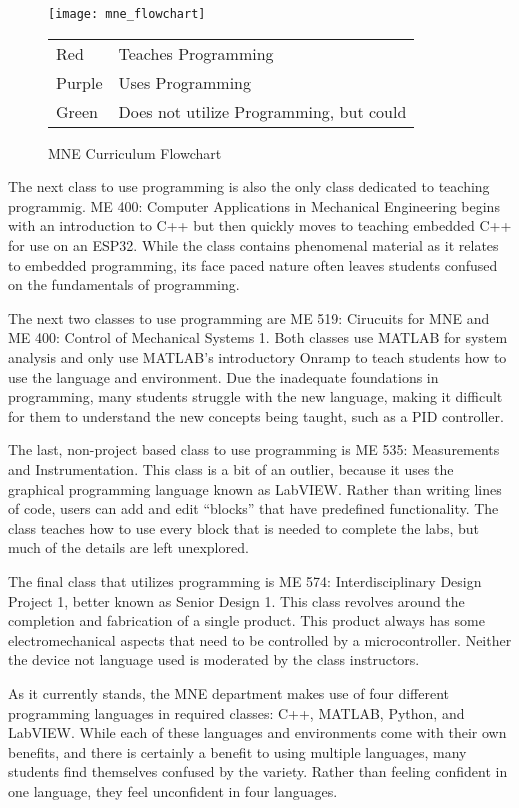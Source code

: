 \begin{figure}[h]
    \texttt{[image: mne\_flowchart]}
    \begin{tabular}{l@{ : }l}
        Red & Teaches Programming \\
        Purple & Uses Programming \\
        Green & Does not utilize Programming, but could \\
    \end{tabular}
    \centering
    \caption{MNE Curriculum Flowchart}
    \centering
    \label{fig:mne_flowchart}
\end{figure}

The next class to use programming is also the only class dedicated to teaching programmig.
ME 400: Computer Applications in Mechanical Engineering begins with an introduction to C++
but then quickly moves to teaching embedded C++ for use on an ESP32. While the class
contains phenomenal material as it relates to embedded programming, its face paced nature
often leaves students confused on the fundamentals of programming. 

The next two classes to use programming are ME 519: Cirucuits for MNE and ME 400:
Control of Mechanical Systems 1. Both classes use MATLAB for system analysis and only use
MATLAB's introductory Onramp to teach students how to use the language and environment.
Due the inadequate foundations in programming, many students struggle with the new language,
making it difficult for them to understand the new concepts being taught, such as a PID
controller.

The last, non-project based class to use programming is ME 535: Measurements and Instrumentation.
This class is a bit of an outlier, because it uses the graphical programming language known
as LabVIEW. Rather than writing lines of code, users can add and edit ``blocks'' that have
predefined functionality. The class teaches how to use every block that is needed to complete
the labs, but much of the details are left unexplored.

The final class that utilizes programming is ME 574: Interdisciplinary Design Project 1, 
better known as Senior Design 1. This class revolves around the completion and fabrication
of a single product. This product always has some electromechanical aspects that need to
be controlled by a microcontroller. Neither the device not language used is moderated by
the class instructors.

As it currently stands, the MNE department makes use of four different programming languages
in required classes: C++, MATLAB, Python, and LabVIEW. While each of these languages and 
environments come with their own benefits, and there is certainly a benefit to using 
multiple languages, many students find themselves confused by the variety. Rather than
feeling confident in one language, they feel unconfident in four languages.

